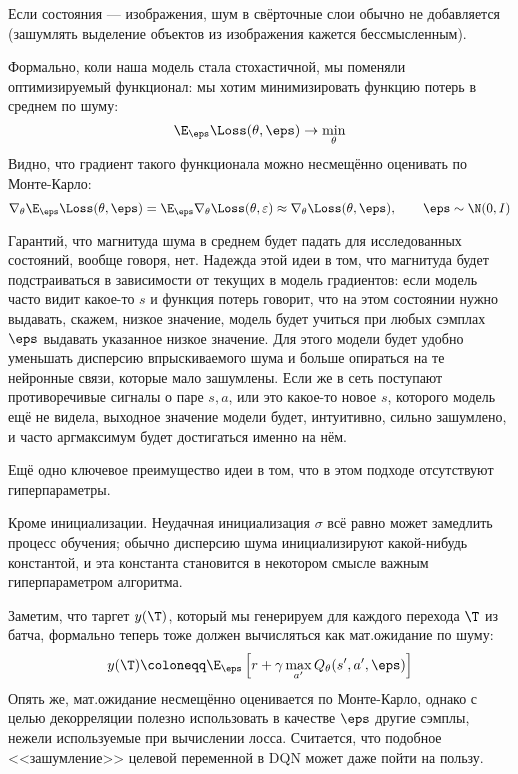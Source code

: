 \begin{remark}
Если состояния --- изображения, шум в свёрточные слои обычно не добавляется (зашумлять выделение объектов из изображения кажется бессмысленным).
\end{remark}

Формально, коли наша модель стала стохастичной, мы поменяли оптимизируемый функционал: мы хотим минимизировать функцию потерь в среднем по шуму:
$$\E_{\eps} \Loss(\theta, \eps) \to \min_\theta$$
Видно, что градиент такого функционала можно несмещённо оценивать по Монте-Карло:
$$\nabla_\theta \E_{\eps} \Loss(\theta, \eps) = \E_{\eps} \nabla_\theta \Loss(\theta, \varepsilon) \approx \nabla_\theta \Loss(\theta, \eps), \qquad \eps \sim \N(0, I)$$

Гарантий, что магнитуда шума в среднем будет падать для исследованных состояний, вообще говоря, нет. Надежда этой идеи в том, что магнитуда будет подстраиваться в зависимости от текущих в модель градиентов: если модель часто видит какое-то $s$ и функция потерь говорит, что на этом состоянии нужно выдавать, скажем, низкое значение, модель будет учиться при любых сэмплах $\eps$ выдавать указанное низкое значение. Для этого модели будет удобно уменьшать дисперсию впрыскиваемого шума и больше опираться на те нейронные связи, которые мало зашумлены. Если же в сеть поступают противоречивые сигналы о паре $s, a$, или это какое-то новое $s$, которого модель ещё не видела, выходное значение модели будет, интуитивно, сильно зашумлено, и часто аргмаксимум будет достигаться именно на нём. 

Ещё одно ключевое преимущество идеи в том, что в этом подходе отсутствуют гиперпараметры.

\begin{remark}
Кроме инициализации. Неудачная инициализация $\sigma$ всё равно может замедлить процесс обучения; обычно дисперсию шума инициализируют какой-нибудь константой, и эта константа становится в некотором смысле важным гиперпараметром алгоритма.
\end{remark}

Заметим, что таргет $y(\T)$, который мы генерируем для каждого перехода $\T$ из батча, формально теперь тоже должен вычисляться как мат.ожидание по шуму:
$$y(\T) \coloneqq \E_\eps \left[ r + \gamma \max_{a'} Q_{\theta}(s', a', \eps) \right]$$
Опять же, мат.ожидание несмещённо оценивается по Монте-Карло, однако с целью декорреляции полезно использовать в качестве $\eps$ другие сэмплы, нежели используемые при вычислении лосса. Считается, что подобное <<зашумление>> целевой переменной в DQN может даже пойти на пользу.

